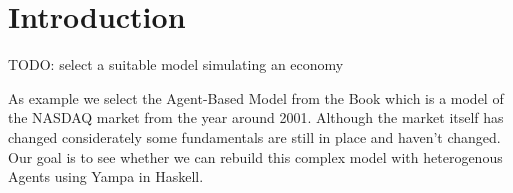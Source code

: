 \section{Introduction}

TODO: select a suitable model simulating an economy 

As example we select the Agent-Based Model from the Book \cite{_nasdaq_????} which is a model of the NASDAQ market from the year around 2001. Although the market itself has changed considerately some fundamentals are still in place and haven't changed. Our goal is to see whether we can rebuild this complex model with heterogenous Agents using Yampa in Haskell. \\